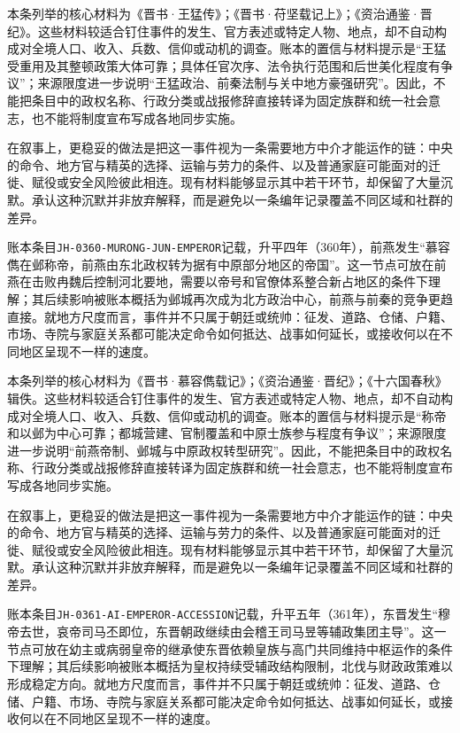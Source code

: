 本条列举的核心材料为《晋书·王猛传》；《晋书·苻坚载记上》；《资治通鉴·晋纪》。这些材料较适合钉住事件的发生、官方表述或特定人物、地点，却不自动构成对全境人口、收入、兵数、信仰或动机的调查。账本的置信与材料提示是“王猛受重用及其整顿政策大体可靠；具体任官次序、法令执行范围和后世美化程度有争议”；来源限度进一步说明“王猛政治、前秦法制与关中地方豪强研究”。因此，不能把条目中的政权名称、行政分类或战报修辞直接转译为固定族群和统一社会意志，也不能将制度宣布写成各地同步实施。

在叙事上，更稳妥的做法是把这一事件视为一条需要地方中介才能运作的链：中央的命令、地方官与精英的选择、运输与劳力的条件、以及普通家庭可能面对的迁徙、赋役或安全风险彼此相连。现有材料能够显示其中若干环节，却保留了大量沉默。承认这种沉默并非放弃解释，而是避免以一条编年记录覆盖不同区域和社群的差异。

账本条目\texttt{JH-0360-MURONG-JUN-EMPEROR}记载，升平四年（360年），前燕发生“慕容儁在邺称帝，前燕由东北政权转为据有中原部分地区的帝国”。这一节点可放在前燕在击败冉魏后控制河北要地，需要以帝号和官僚体系整合新占地区的条件下理解；其后续影响被账本概括为邺城再次成为北方政治中心，前燕与前秦的竞争更趋直接。就地方尺度而言，事件并不只属于朝廷或统帅：征发、道路、仓储、户籍、市场、寺院与家庭关系都可能决定命令如何抵达、战事如何延长，或接收何以在不同地区呈现不一样的速度。

本条列举的核心材料为《晋书·慕容儁载记》；《资治通鉴·晋纪》；《十六国春秋》辑佚。这些材料较适合钉住事件的发生、官方表述或特定人物、地点，却不自动构成对全境人口、收入、兵数、信仰或动机的调查。账本的置信与材料提示是“称帝和以邺为中心可靠；都城营建、官制覆盖和中原士族参与程度有争议”；来源限度进一步说明“前燕帝制、邺城与中原政权转型研究”。因此，不能把条目中的政权名称、行政分类或战报修辞直接转译为固定族群和统一社会意志，也不能将制度宣布写成各地同步实施。

在叙事上，更稳妥的做法是把这一事件视为一条需要地方中介才能运作的链：中央的命令、地方官与精英的选择、运输与劳力的条件、以及普通家庭可能面对的迁徙、赋役或安全风险彼此相连。现有材料能够显示其中若干环节，却保留了大量沉默。承认这种沉默并非放弃解释，而是避免以一条编年记录覆盖不同区域和社群的差异。

账本条目\texttt{JH-0361-AI-EMPEROR-ACCESSION}记载，升平五年（361年），东晋发生“穆帝去世，哀帝司马丕即位，东晋朝政继续由会稽王司马昱等辅政集团主导”。这一节点可放在幼主或病弱皇帝的继承使东晋依赖皇族与高门共同维持中枢运作的条件下理解；其后续影响被账本概括为皇权持续受辅政结构限制，北伐与财政政策难以形成稳定方向。就地方尺度而言，事件并不只属于朝廷或统帅：征发、道路、仓储、户籍、市场、寺院与家庭关系都可能决定命令如何抵达、战事如何延长，或接收何以在不同地区呈现不一样的速度。


